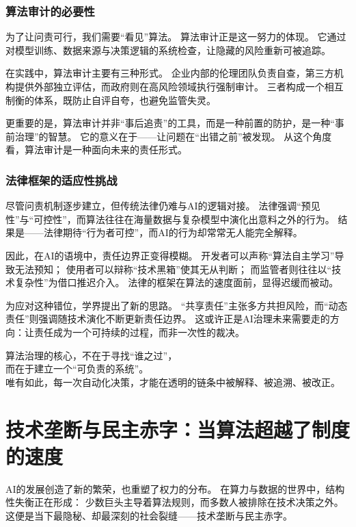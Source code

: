 \subsubsection{算法审计的必要性}

为了让问责可行，我们需要“看见”算法。
算法审计正是这一努力的体现。
它通过对模型训练、数据来源与决策逻辑的系统检查，让隐藏的风险重新可被追踪。

在实践中，算法审计主要有三种形式。
企业内部的伦理团队负责自查，第三方机构提供外部独立评估，而政府则在高风险领域执行强制审计。
三者构成一个相互制衡的体系，既防止自评自夸，也避免监管失灵。

更重要的是，算法审计并非“事后追责”的工具，而是一种前置的防护，是一种“事前治理”的智慧。
它的意义在于——让问题在“出错之前”被发现。
从这个角度看，算法审计是一种面向未来的责任形式。

\subsubsection{法律框架的适应性挑战}

尽管问责机制逐步建立，但传统法律仍难与AI的逻辑对接。
法律强调“预见性”与“可控性”，而算法往往在海量数据与复杂模型中演化出意料之外的行为。
结果是——法律期待“行为者可控”，而AI的行为却常常无人能完全解释。

因此，在AI的语境中，责任边界正变得模糊。
开发者可以声称“算法自主学习”导致无法预知；
使用者可以辩称“技术黑箱”使其无从判断；
而监管者则往往以“技术复杂性”为借口推迟介入。
法律的框架在算法的速度面前，显得迟缓而被动。

为应对这种错位，学界提出了新的思路。
“共享责任”主张多方共担风险，而“动态责任”则强调随技术演化不断更新责任边界。
这或许正是AI治理未来需要走的方向：让责任成为一个可持续的过程，而非一次性的裁决。

\begin{center}
算法治理的核心，不在于寻找“谁之过”，\\
而在于建立一个“可负责的系统”。\\
唯有如此，每一次自动化决策，才能在透明的链条中被解释、被追溯、被改正。
\end{center}

\section{技术垄断与民主赤字：当算法超越了制度的速度}

AI的发展创造了新的繁荣，也重塑了权力的分布。
在算力与数据的世界中，结构性失衡正在形成：
少数巨头主导着算法规则，而多数人被排除在技术决策之外。
这便是当下最隐秘、却最深刻的社会裂缝——技术垄断与民主赤字。

